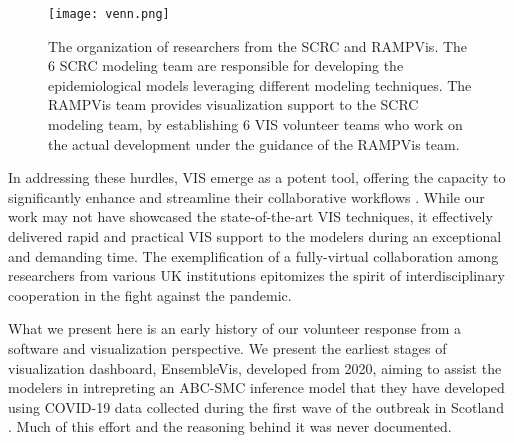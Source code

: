 \begin{figure}[tb!]
    \centering
    \texttt{[image: venn.png]}
    \caption{The organization of researchers from the SCRC and RAMPVis. The 6 SCRC modeling team are responsible for developing the epidemiological models leveraging different modeling techniques. The RAMPVis team provides visualization support to the SCRC modeling team, by establishing 6 VIS volunteer teams who work on the actual development under the guidance of the RAMPVis team.
    }
    \label{fig:venn}

\end{figure}

In addressing these hurdles, \ac{VIS} emerge as a potent tool, offering the capacity to significantly enhance and streamline their collaborative workflows \cite{swallow2022Challenges}.
While our work may not have showcased the state-of-the-art VIS techniques, it effectively delivered rapid and practical VIS support to the modelers during an exceptional and demanding time.
The exemplification of a fully-virtual collaboration among researchers from various UK institutions epitomizes the spirit of interdisciplinary cooperation in the fight against the pandemic.

What we present here is an early history of our volunteer response from a software and visualization perspective. We present the earliest stages of visualization dashboard, EnsembleVis, developed from 2020, aiming to assist the modelers in intrepreting an \ac{ABC-SMC} inference model that they have developed using COVID-19 data collected during the first wave of the outbreak in Scotland \cite{2020Covid19}. Much of this effort and the reasoning behind it was never documented.
